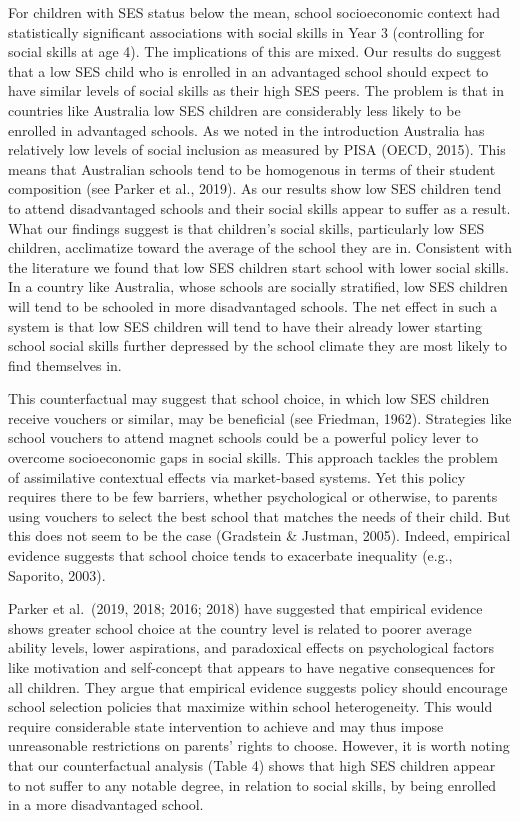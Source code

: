 \documentclass[
  english,
  man]{apa6}
\begin{document}
For children with SES status below the mean, school socioeconomic context had statistically significant associations with social skills in Year 3 (controlling for social skills at age 4). The implications of this are mixed. Our results do suggest that a low SES child who is enrolled in an advantaged school should expect to have similar levels of social skills as their high SES peers. The problem is that in countries like Australia low SES children are considerably less likely to be enrolled in advantaged schools. As we noted in the introduction Australia has relatively low levels of social inclusion as measured by PISA (OECD, 2015). This means that Australian schools tend to be homogenous in terms of their student composition (see Parker et al., 2019). As our results show low SES children tend to attend disadvantaged schools and their social skills appear to suffer as a result. What our findings suggest is that children's social skills, particularly low SES children, acclimatize toward the average of the school they are in. Consistent with the literature we found that low SES children start school with lower social skills. In a country like Australia, whose schools are socially stratified, low SES children will tend to be schooled in more disadvantaged schools. The net effect in such a system is that low SES children will tend to have their already lower starting school social skills further depressed by the school climate they are most likely to find themselves in.

This counterfactual may suggest that school choice, in which low SES children receive vouchers or similar, may be beneficial (see Friedman, 1962). Strategies like school vouchers to attend magnet schools could be a powerful policy lever to overcome socioeconomic gaps in social skills. This approach tackles the problem of assimilative contextual effects via market-based systems. Yet this policy requires there to be few barriers, whether psychological or otherwise, to parents using vouchers to select the best school that matches the needs of their child. But this does not seem to be the case (Gradstein \& Justman, 2005). Indeed, empirical evidence suggests that school choice tends to exacerbate inequality (e.g., Saporito, 2003).

Parker et al.~(2019, 2018; 2016; 2018) have suggested that empirical evidence shows greater school choice at the country level is related to poorer average ability levels, lower aspirations, and paradoxical effects on psychological factors like motivation and self-concept that appears to have negative consequences for all children. They argue that empirical evidence suggests policy should encourage school selection policies that maximize within school heterogeneity. This would require considerable state intervention to achieve and may thus impose unreasonable restrictions on parents' rights to choose. However, it is worth noting that our counterfactual analysis (Table 4) shows that high SES children appear to not suffer to any notable degree, in relation to social skills, by being enrolled in a more disadvantaged school.
\end{document}
